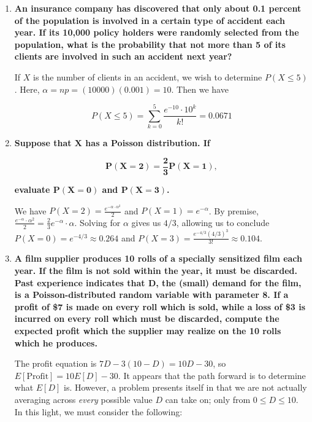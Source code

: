 \documentclass[10pt, oneside]{article}   	%
\theoremstyle{definition}
\begin{document}
\begin{enumerate}[label=8.\arabic*]
\item  \begin{tcolorbox}[
  colback=Cerulean!5!white,
  colframe=Cerulean!75!black]
\textbf{An insurance company has discovered that only about 0.1 percent of the population is involved in a certain type of accident each year. If its 10,000 policy holders were randomly selected from the population, what is the probability that not more than 5 of its clients are involved in such an accident next year?}
\end{tcolorbox}

If $X$ is the number of clients in an accident, we wish to determine $P(X \leq 5)$. Here, $\alpha = np = (10000)(0.001) = 10$. Then we have

\[ P(X \leq 5) = \sum^5_{k = 0} \frac{e^{-10} \cdot 10^k}{k!} = \boxed{0.0671} \]

\item  \begin{tcolorbox}[
  colback=Cerulean!5!white,
  colframe=Cerulean!75!black]
\textbf{Suppose that $\bm{X}$ has a Poisson distribution. If}

\[ \bm{P(X = 2) = \frac{2}{3} P(X = 1),} \]

\textbf{evaluate $\bm{P(X = 0)}$ and $\bm{P(X = 3)}$.}
\end{tcolorbox}

We have $P(X = 2) = \frac{e^{-\alpha \cdot \alpha^2}}{2}$ and $P(X = 1) = e^{-\alpha}$. By premise, $\frac{e^{-\alpha} \cdot \alpha^2}{2} = \frac{2}{3} e^{-\alpha} \cdot \alpha$. Solving for $\alpha$ gives us $4/3$, allowing us to conclude $P(X = 0) = e^{-4/3} \approx \boxed{0.264}$ and $P(X = 3) = \frac{e^{-4/3} (4/3)^3}{3!} \approx \boxed{0.104}$.

\item  \begin{tcolorbox}[
  colback=Cerulean!5!white,
  colframe=Cerulean!75!black]
\textbf{A film supplier produces 10 rolls of a specially sensitized film each year. If the film is not sold within the year, it must be discarded. Past experience indicates that $\bm{D}$, the (small) demand for the film, is a Poisson-distributed random variable with parameter 8. If a profit of \$7 is made on every roll which is sold, while a loss of \$3 is incurred on every roll which must be discarded, compute the expected profit which the supplier may realize on the 10 rolls which he produces.}
\end{tcolorbox}

The profit equation is $7D - 3(10 - D) = 10D - 30$, so $E[\text{Profit}] = 10 E[D] - 30$. It appears that the path forward is to determine what $E[D]$ is. However, a problem presents itself in that we are not actually averaging across \textit{every} possible value $D$ can take on; only from $0 \leq D \leq 10$. In this light, we must consider the following:


\end{enumerate}
\end{document}
